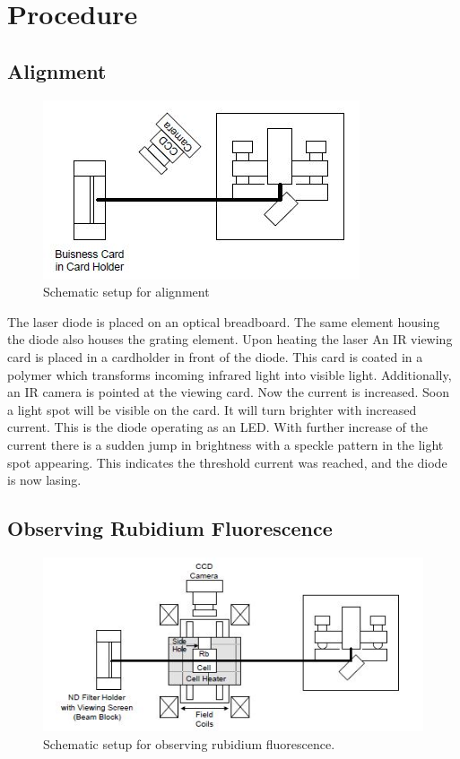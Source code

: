 \section{Procedure}
\label{sec:Durchführung}

\subsection{Alignment}
\label{sec:alignmentSpeckle}
\begin{figure}
    \includegraphics[width=\linewidth]{content/aligment.jpg}
    \caption{Schematic setup for alignment \cite{Anleitung}}
 \end{figure}

The laser diode is placed on an optical breadboard. The same element housing the diode also houses the grating element. Upon heating the laser %
An IR viewing card is placed in a cardholder in front of the diode. This card is coated in a polymer which transforms incoming infrared light into visible light.
Additionally, an IR camera is pointed at the viewing card.
Now the current is increased. Soon a light spot will be visible on the card. It will turn brighter with increased current. This is the diode operating as an LED.
With further increase of the current there is a sudden jump in brightness with a speckle pattern in the light spot appearing. This indicates the threshold current was reached, and the diode is now lasing.


\subsection{Observing Rubidium Fluorescence}
\label{sec:DurchRubiFluor}
\begin{figure}
    \includegraphics[width=\linewidth]{content/floresence.jpg}
    \caption{Schematic setup for observing rubidium fluorescence.}
 \end{figure}

